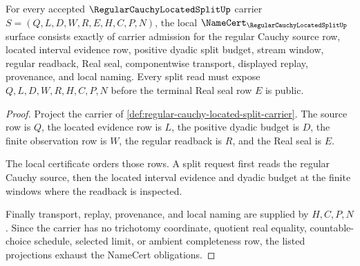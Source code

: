 \begin{theorem}
\label{thm:regular-cauchy-located-split-namecert-obligations}
For every accepted $\RegularCauchyLocatedSplitUp$ carrier $S=(Q,L,D,W,R,E,H,C,P,N)$, the local $\NameCert_{\RegularCauchyLocatedSplitUp}$ surface consists exactly of carrier admission for the regular Cauchy source row, located interval evidence row, positive dyadic split budget, stream window, regular readback, Real seal, componentwise transport, displayed replay, provenance, and local naming. Every split read must expose $Q,L,D,W,R,H,C,P,N$ before the terminal Real seal row $E$ is public.
\end{theorem}
\begin{proof}
Project the carrier of \autoref{def:regular-cauchy-located-split-carrier}. The source row is $Q$, the located evidence row is $L$, the positive dyadic budget is $D$, the finite observation row is $W$, the regular readback is $R$, and the Real seal is $E$.

The local certificate orders those rows. A split request first reads the regular Cauchy source, then the located interval evidence and dyadic budget at the finite windows where the readback is inspected.

Finally transport, replay, provenance, and local naming are supplied by $H,C,P,N$. Since the carrier has no trichotomy coordinate, quotient real equality, countable-choice schedule, selected limit, or ambient completeness row, the listed projections exhaust the NameCert obligations.
\end{proof}

